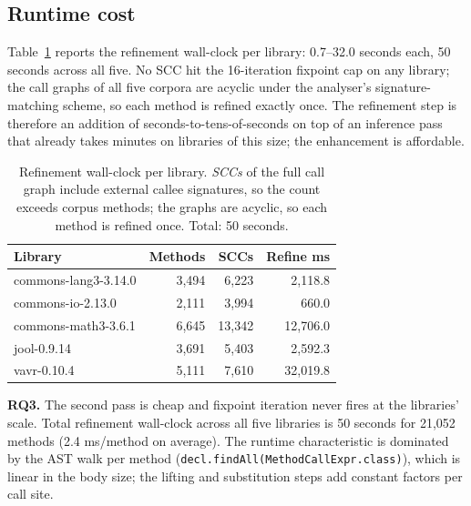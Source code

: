 \subsection{Runtime cost}

Table~\ref{tab:runtime} reports the refinement wall-clock per
library: 0.7--32.0 seconds each, 50 seconds across all five. No SCC hit
the 16-iteration fixpoint cap on any library; the call graphs of all
five corpora are acyclic under the analyser's signature-matching
scheme, so each method is refined exactly once. The refinement step is
therefore an addition of seconds-to-tens-of-seconds on top of an
inference pass that already takes minutes on libraries of this size;
the enhancement is affordable.

\begin{table}[ht]
\centering
\small
\caption{Refinement wall-clock per library. \emph{SCCs} of the full call graph include external callee signatures, so the count exceeds corpus methods; the graphs are acyclic, so each method is refined once. Total: 50 seconds.}
\label{tab:runtime}
\begin{tabular}{lrrr}
\toprule
\textbf{Library} & \textbf{Methods} & \textbf{SCCs} & \textbf{Refine ms} \\
\midrule
commons-lang3-3.14.0   & 3{,}494 & 6{,}223  & 2{,}118.8 \\
commons-io-2.13.0      & 2{,}111 & 3{,}994  & 660.0     \\
commons-math3-3.6.1    & 6{,}645 & 13{,}342 & 12{,}706.0\\
jool-0.9.14            & 3{,}691 & 5{,}403  & 2{,}592.3 \\
vavr-0.10.4            & 5{,}111 & 7{,}610  & 32{,}019.8\\
\bottomrule
\end{tabular}
\end{table}

\textbf{RQ3.} The second pass is cheap and fixpoint iteration never fires at the libraries' scale. Total refinement
wall-clock across all five libraries is 50 seconds for 21{,}052
methods (2.4 ms/method on average). The runtime characteristic is
dominated by the AST walk per method
(\texttt{decl.findAll(MethodCallExpr.class)}), which is linear in
the body size; the lifting and substitution steps add constant
factors per call site.

